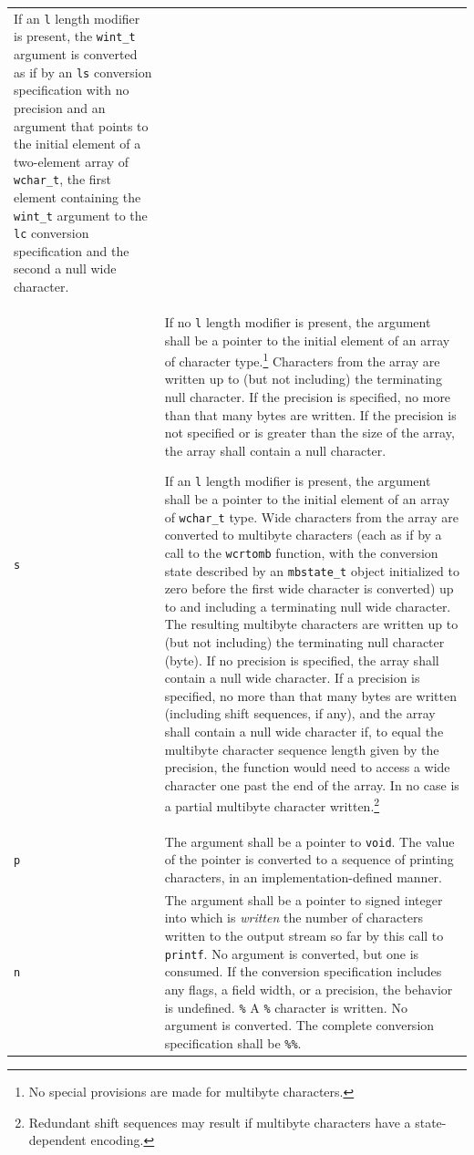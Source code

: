 \begin{longtable}{p{}p{}}
If an \texttt{l} length modifier is present, the \texttt{wint\_t} argument is
converted as if by an \texttt{ls} conversion specification with no precision
and an argument that points to the initial element of a two-element array of
\texttt{wchar\_t}, the first element containing the \texttt{wint\_t} argument
to the \texttt{lc} conversion specification and the second a null wide
character.\\
\texttt{s}&If no \texttt{l} length modifier is present, the argument shall be a
pointer to the initial element of an array of character type.\footnote{No
  special provisions are made for multibyte characters.} Characters from the
array are written up to (but not including) the terminating null character. If
the precision is specified, no more than that many bytes are written. If the
precision is not specified or is greater than the size of the array, the array
shall contain a null character.

If an \texttt{l} length modifier is present, the argument shall be a pointer to
the initial element of an array of \texttt{wchar\_t} type. Wide characters from
the array are converted to multibyte characters (each as if by a call to the
\texttt{wcrtomb} function, with the conversion state described by an
\texttt{mbstate\_t} object initialized to zero before the first wide character
is converted) up to and including a terminating null wide character. The
resulting multibyte characters are written up to (but not including) the
terminating null character (byte). If no precision is specified, the array
shall contain a null wide character. If a precision is specified, no more than
that many bytes are written (including shift sequences, if any), and the array
shall contain a null wide character if, to equal the multibyte character
sequence length given by the precision, the function would need to access a
wide character one past the end of the array. In no case is a partial multibyte
character written.\footnote{Redundant shift sequences may result if multibyte
  characters have a state-dependent encoding.}\\
\texttt{p}&The argument shall be a pointer to \texttt{void}. The value of the
pointer is converted to a sequence of printing characters, in an
implementation-defined manner.\\
\texttt{n}&The argument shall be a pointer to signed integer into which is
\textit{written} the number of characters written to the output stream so far
by this call to \texttt{printf}. No argument is converted, but one is
consumed. If the conversion specification includes any flags, a field width, or
a precision, the behavior is undefined.
\texttt{\%} A \texttt{\%} character is written. No argument is converted. The
complete conversion specification shall be \texttt{\%\%}.
\end{longtable}

